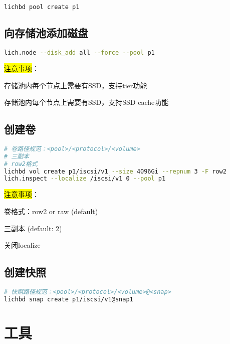 \begin{lstlisting}[language=bash]
lichbd pool create p1
\end{lstlisting}

\subsection{向存储池添加磁盘}

\begin{lstlisting}[language=bash]
lich.node --disk_add all --force --pool p1
\end{lstlisting}

\hl{注意事项}：
\begin{compactenum}
\item 存储池内每个节点上需要有SSD，支持tier功能
\item 存储池内每个节点上需要有SSD，支持SSD cache功能
\end{compactenum}

\subsection{创建卷}

\begin{lstlisting}[language=bash]
# 卷路径规范：<pool>/<protocol>/<volume>
# 三副本
# row2格式
lichbd vol create p1/iscsi/v1 --size 4096Gi --repnum 3 -F row2
lich.inspect --localize /iscsi/v1 0 --pool p1
\end{lstlisting}

\hl{注意事项}：
\begin{compactenum}
\item 卷格式：row2 or raw (default)
\item 三副本 (default: 2)
\item 关闭localize
\end{compactenum}

\subsection{创建快照}

\begin{lstlisting}[language=bash]
# 快照路径规范：<pool>/<protocol>/<volume>@<snap>
lichbd snap create p1/iscsi/v1@snap1
\end{lstlisting}

\section{工具}

